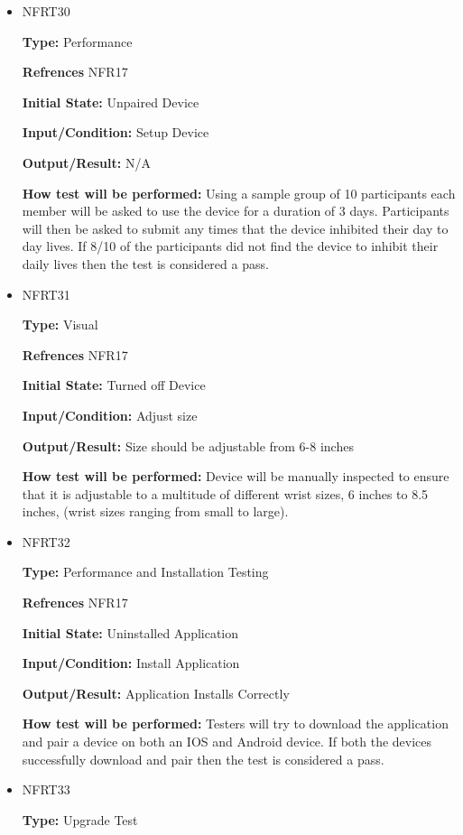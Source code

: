 \documentclass[12pt, titlepage]{article}
\begin{document}
\begin{itemize}
\item{NFRT30}

\textbf{Type:} Performance

\textbf{Refrences} NFR17
					
\textbf{Initial State:} Unpaired Device
					
\textbf{Input/Condition:} Setup Device
					
\textbf{Output/Result:} N/A
					
\textbf{How test will be performed:} Using a sample group of 10 participants each member will be asked to use the device for a duration of 3 days. Participants will then be asked to submit any times that the device inhibited their day to day lives. If 8/10 of the participants did not find the device to inhibit their daily lives then the test is considered a pass.

\item{NFRT31}

\textbf{Type:} Visual

\textbf{Refrences} NFR17
					
\textbf{Initial State:} Turned off Device
					
\textbf{Input/Condition:} Adjust size
					
\textbf{Output/Result:} Size should be adjustable from 6-8 inches
					
\textbf{How test will be performed:} Device will be manually inspected to ensure that it is adjustable to a multitude of different wrist sizes, 6 inches to 8.5 inches, (wrist sizes ranging from small to large). 

\item{NFRT32}

\textbf{Type:} Performance and Installation Testing

\textbf{Refrences} NFR17
					
\textbf{Initial State:} Uninstalled Application
					
\textbf{Input/Condition:} Install Application
					
\textbf{Output/Result:} Application Installs Correctly
					
\textbf{How test will be performed:} Testers will try to download the application and pair a device on both an IOS and Android device. If both the devices successfully download and pair then the test is considered a pass. 

\item{NFRT33}

\textbf{Type:} Upgrade Test


\end{itemize}
\end{document}
